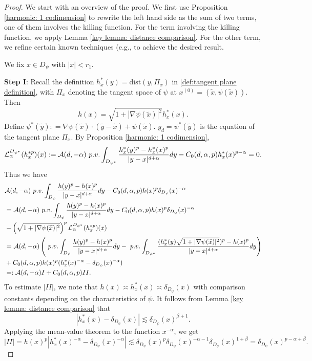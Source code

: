 \documentclass[12pt,a4paper]{amsart}
\numberwithin{equation}{section}
\theoremstyle{plain}
\newcommand{\al}{\alpha}
\newcommand{\be}{\beta}
\newcommand{\de}{\delta}
\newcommand{\mc}{\mathcal}
\newcommand{\wt}{\widetilde}
\newcommand{\1}{\mathbbm{1}}
\begin{document}
\begin{proof}
We start with an overview of the proof.  We first use Proposition \ref{harmonic: 1 codimension} to rewrite the left hand side  as the sum of two terms, one of them involves the killing function. For the term involving the killing function, we apply Lemma \ref{key lemma: distance comparison}. For the other term, we refine certain known techniques (e.g., \cite{BBC03, Guan07, CKSV20} to achieve the desired result.


We fix $x \in D_{\psi}$ with $|x|<r_1$.


\textbf{Step I}:
Recall the definition \( h_x^*(y) = \text{dist}(y, \Pi_x) \) in \eqref{def:tangent plane definition}, with \( \Pi_x \) denoting the tangent space of \( \psi \) at \( x^{(0)} = (\wt x, \psi(\wt x)) \). Then 
 $$
 h(x) = \sqrt{1+|\nabla \psi(\wt{x})|^2} h_x^*(x).
 $$
Define $\psi^*(\wt y): = \nabla \psi(\wt x) \cdot (\wt y - \wt x) + \psi(\wt x)$. $y_d=\psi^*(\wt y)$ is the equation of the tangent plane $\Pi_x$.
By Proposition \ref{harmonic: 1 codimension}, 
\begin{align*}
\mc L_{\alpha}^{D_{\psi^*}} (h_x^{*p})(x) := 
\mc{A}(d,-\alpha) {\ \rm p.v.}\int_{D_{\psi^*}} \frac{h_x^*(y)^p - h_x^*(x)^p}{|y-x|^{d+\alpha}}dy - C_0(d,\alpha,p)h_x^*(x)^{p-\alpha} = 0.
\end{align*}
Thus we have 
\begin{align*}
& \mc{A}(d,-\alpha) {\ \rm p.v.}\int_{D_{\psi}} \frac{h(y)^p - h(x)^p}{|y-x|^{d+\alpha}}dy - C_0(d,\alpha,p)h(x)^p \delta_{D_{\psi}}(x)^{-\alpha} \\
& = \mc{A}(d,-\alpha) {\ \rm p.v.}\int_{D_{\psi}} \frac{h(y)^p - h(x)^p}{|y-x|^{d+\alpha}}dy - C_0(d,\alpha,p)h(x)^p \delta_{D_{\psi}}(x)^{-\alpha} \\
& - \left(\sqrt{1+|\nabla \psi(\wt{x})|^2}\right)^p \mc L_{\alpha}^{D_{\psi^*}} (h_x^{*p})(x) \\
& = \mc{A}(d,-\alpha) \left({\ \rm p.v.}\int_{D_{\psi}} \frac{h(y)^p - h(x)^p}{|y-x|^{d+\alpha}}dy - {\ \rm p.v.} \int_{D_{\psi^*}} \frac{(h_x^*(y)\sqrt{1+|\nabla \psi(\wt x)|^2})^p - h(x)^p}{|y-x|^{d+\alpha}}dy \right) \\
& + C_0(d,\alpha,p)h(x)^p(h_x^*(x)^{-\alpha} - \delta_{D_{\psi}}(x)
^{-\alpha})\\
&=:\mc{A}(d,-\alpha) I+C_0(d,\alpha,p) II.
\end{align*}
To estimate $|II|$, we note that $h(x)\asymp h_x^\ast(x)\asymp \de_{D_{\psi}}(x)$ with comparison constants depending on the characteristics of $\psi$. 
 It follows from  Lemma \ref{key lemma: distance comparison} that
\begin{equation}
\label{reduction-1}
    |h_x^*(x) - \delta_{D_{\psi}}(x)|\lesssim  \delta_{D_{\psi}}(x)^{\beta+1}.
\end{equation}
Applying the mean-value theorem to the function $x^{-\al}$, we get
\begin{equation}\label{part-II}
    |II|= h(x)^p \left| h_x^*(x)^{-\alpha} - \delta_{D_{\psi}}(x)^{-\alpha} \right| \lesssim \delta_{D_{\psi}}(x)^p \delta_{D_{\psi}}(x)^{-\alpha - 1} \delta_{D_{\psi}}(x)^{1+\be} = \delta_{D_{\psi}}(x)^{p-\alpha+\beta}.
\end{equation}



\end{proof}
\end{document}
